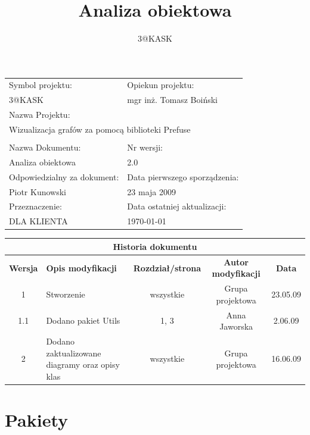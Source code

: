 \documentclass[a4paper,10pt]{article}
\title{Analiza obiektowa}
\author{3@KASK}
\begin{document}



\maketitle


\begin{center}
\begin{longtable}{|p{7cm}|p{7cm}|}
\hline
Symbol projektu: & Opiekun projektu:   \tabularnewline 
3@KASK & mgr inż. Tomasz Boiński    \tabularnewline \hline
\multicolumn{2}{|l|}{Nazwa Projektu: } \tabularnewline
\multicolumn{2}{|l|}{Wizualizacja grafów za pomocą biblioteki Prefuse } \tabularnewline 
\hline
\multicolumn{2}{l}{ } \tabularnewline %
\hline 
Nazwa Dokumentu: & Nr wersji:   \tabularnewline 
Analiza obiektowa & 2.0 \tabularnewline \hline
Odpowiedzialny za dokument: & Data pierwszego sporządzenia:   \tabularnewline 
Piotr Kunowski & 23 maja 2009 \tabularnewline \hline
Przeznaczenie: & Data ostatniej aktualizacji:   \tabularnewline 
DLA KLIENTA & \today \tabularnewline \hline
\end{longtable}
\end{center}


\begin{center}
\begin{longtable}{|c|p{4cm}|c|c|c|}
\multicolumn{5}{c}{\textbf{Historia dokumentu}} \tabularnewline \hline
\textbf{Wersja} & \textbf{Opis modyfikacji} & \textbf{Rozdział/strona} & \textbf{Autor modyfikacji} & \textbf{Data} \tabularnewline \hline 
1 & Stworzenie & wszystkie & Grupa projektowa & 23.05.09 \tabularnewline \hline
1.1 & Dodano pakiet Utils & 1, 3 & Anna Jaworska & 2.06.09 \tabularnewline \hline
2 & Dodano zaktualizowane diagramy oraz opisy klas & wszystkie & Grupa projektowa & 16.06.09 \tabularnewline \hline

\end{longtable}
\end{center}


\newpage
\tableofcontents
\newpage

\section{Pakiety}
\end{document}
